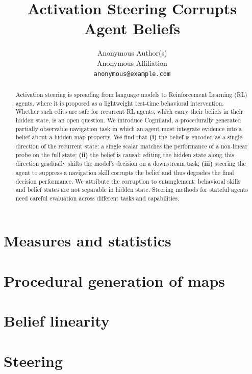 \documentclass{article}
\title{Activation Steering Corrupts Agent Beliefs}
\author{%
  Anonymous Author(s) \\
  Anonymous Affiliation \\
  \texttt{anonymous@example.com} \\
}
\begin{document}
\maketitle

\begin{abstract}
Activation steering is spreading from language models to Reinforcement Learning (RL) agents, where it is proposed as a lightweight test-time behavioral intervention. Whether such edits are safe for recurrent RL agents, which carry their beliefs in their hidden state, is an open question. We introduce Cogniland, a procedurally generated partially observable navigation task in which an agent must integrate evidence into a belief about a hidden map property. We find that \textbf{(i)} the belief is encoded as a single direction of the recurrent state: a single scalar matches the performance of a non-linear probe on the full state; \textbf{(ii)} the belief is causal: editing the hidden state along this direction gradually shifts the model's decision on a downstream task; \textbf{(iii)} steering the agent to suppress a navigation skill corrupts the belief and thus degrades the final decision performance. We attribute the corruption to entanglement: behavioral skills and belief states are not separable in hidden state. Steering methods for stateful agents need careful evaluation across different tasks and capabilities.
\end{abstract}















\appendix

\section{Measures and statistics}
\label{app:measures}

\FloatBarrier

\section{Procedural generation of maps}
\label{app:map-generation}

\FloatBarrier


\FloatBarrier


\FloatBarrier

\section{Belief linearity}
\label{app:belief-causality}

\FloatBarrier

\section{Steering}
\label{app:steering}

\FloatBarrier


\newpage
\end{document}
